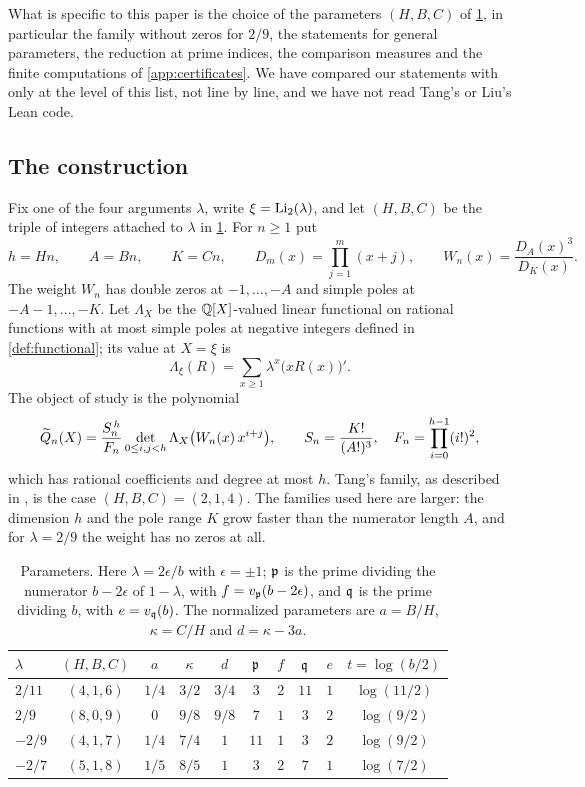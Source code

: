 What is specific to this paper is the choice of the parameters $(H,B,C)$ of \cref{tab:parameters}, in particular the family without zeros for $2/9$, the statements for general parameters, the reduction at prime indices, the comparison measures and the finite computations of \cref{app:certificates}. We have compared our statements with \cite{Litsey2026Li2} only at the level of this list, not line by line, and we have not read Tang's or Liu's Lean code.

\subsection{The construction}\label{sec:intro-construction}
Fix one of the four arguments $\lambda$, write $\xi=\operatorname{Li}_2(\lambda)$, and let $(H,B,C)$ be the triple of integers attached to $\lambda$ in \cref{tab:parameters}. For $n\ge1$ put
\[
h=Hn,\qquad A=Bn,\qquad K=Cn,\qquad D_m(x)=\prod_{j=1}^m(x+j),\qquad W_n(x)=\frac{D_A(x)^3}{D_K(x)} .
\]
The weight $W_n$ has double zeros at $-1,\dots,-A$ and simple poles at $-A-1,\dots,-K$. Let $\Lambda_X$ be the $\mathbb{Q}[X]$-valued linear functional on rational functions with at most simple poles at negative integers defined in \cref{def:functional}; its value at $X=\xi$ is
\[
\Lambda_\xi(R)=\sum_{x\ge1}\lambda^x\bigl(xR(x)\bigr)' .
\]
The object of study is the polynomial
\begin{equation}\label{eq:intro-Q}
\widetilde{Q}_n(X)=\frac{S_n^{\,h}}{F_n}\det_{0\le i,j<h}\Lambda_X\bigl(W_n(x)\,x^{i+j}\bigr),\qquad S_n=\frac{K!}{(A!)^3},\quad F_n=\prod_{i=0}^{h-1}(i!)^2,
\end{equation}
which has rational coefficients and degree at most $h$. Tang's family, as described in \cite[Section~2]{Litsey2026Li2}, is the case $(H,B,C)=(2,1,4)$. The families used here are larger: the dimension $h$ and the pole range $K$ grow faster than the numerator length $A$, and for $\lambda=2/9$ the weight has no zeros at all.

\begin{table}[ht]
\centering
\caption{Parameters. Here $\lambda=2\epsilon/b$ with $\epsilon=\pm1$; $\mathfrak{p}$ is the prime dividing the numerator $b-2\epsilon$ of $1-\lambda$, with $f=v_{\mathfrak{p}}(b-2\epsilon)$, and $\mathfrak{q}$ is the prime dividing $b$, with $e=v_{\mathfrak{q}}(b)$. The normalized parameters are $a=B/H$, $\kappa=C/H$ and $d=\kappa-3a$.}
\label{tab:parameters}
\begin{tabular}{@{}lccccccccc@{}}
\toprule
$\lambda$ & $(H,B,C)$ & $a$ & $\kappa$ & $d$ & $\mathfrak{p}$ & $f$ & $\mathfrak{q}$ & $e$ & $t=\log(b/2)$\\
\midrule
$2/11$ & $(4,1,6)$ & $1/4$ & $3/2$ & $3/4$ & $3$ & $2$ & $11$ & $1$ & $\log(11/2)$\\
$2/9$ & $(8,0,9)$ & $0$ & $9/8$ & $9/8$ & $7$ & $1$ & $3$ & $2$ & $\log(9/2)$\\
$-2/9$ & $(4,1,7)$ & $1/4$ & $7/4$ & $1$ & $11$ & $1$ & $3$ & $2$ & $\log(9/2)$\\
$-2/7$ & $(5,1,8)$ & $1/5$ & $8/5$ & $1$ & $3$ & $2$ & $7$ & $1$ & $\log(7/2)$\\
\bottomrule
\end{tabular}
\end{table}

